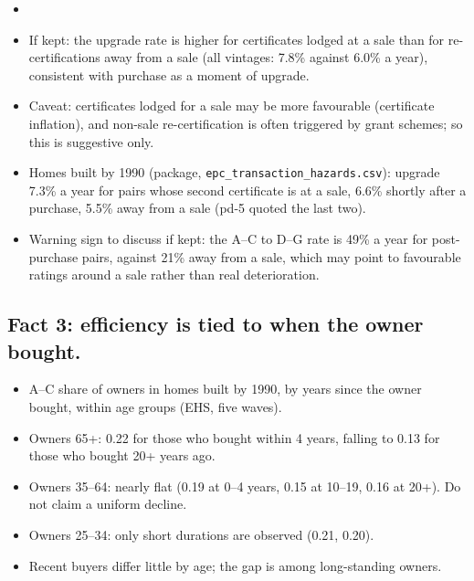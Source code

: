 \begin{itemize}
  \item {}
  \item If kept: the upgrade rate is higher for certificates lodged at a
    sale than for re-certifications away from a sale (all vintages: 7.8\%
    against 6.0\% a year), consistent with purchase as a moment of upgrade.
  \item Caveat: certificates lodged for a sale may be more favourable
    (certificate inflation), and non-sale re-certification is often
    triggered by grant schemes; so this is suggestive only.
  \item Homes built by 1990 (package, \texttt{epc\_transaction\_hazards.csv}):
    upgrade 7.3\% a year for pairs whose second certificate is at a sale,
    6.6\% shortly after a purchase, 5.5\% away from a sale (pd-5 quoted the
    last two).
  \item Warning sign to discuss if kept: the A--C to D--G rate is 49\% a
    year for post-purchase pairs, against 21\% away from a sale, which may
    point to favourable ratings around a sale rather than real
    deterioration. 
\end{itemize}

\subsection{Fact 3: efficiency is tied to when the owner bought.}

\begin{itemize}
  \item A--C share of owners in homes built by 1990, by years since the
    owner bought, within age groups (EHS, five waves).
  \item Owners 65+: 0.22 for those who bought within 4 years, falling to
    0.13 for those who bought 20+ years ago.
  \item Owners 35--64: nearly flat (0.19 at 0--4 years, 0.15 at 10--19,
    0.16 at 20+). Do not claim a uniform decline.
  \item Owners 25--34: only short durations are observed (0.21, 0.20).
  \item Recent buyers differ little by age; the gap is among long-standing
    owners.
\end{itemize}

